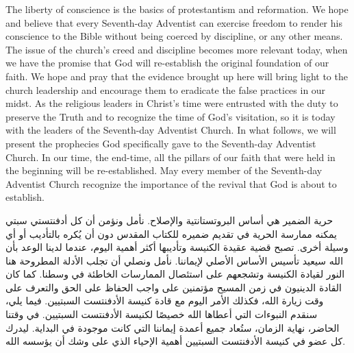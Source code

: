 The liberty of conscience is the basics of protestantism and reformation. We hope and believe that every Seventh-day Adventist can exercise freedom to render his conscience to the Bible without being coerced by discipline, or any other means. The issue of the church's creed and discipline becomes more relevant today, when we have the promise that God will re-establish the original foundation of our faith. We hope and pray that the evidence brought up here will bring light to the church leadership and encourage them to eradicate the false practices in our midst. As the religious leaders in Christ’s time were entrusted with the duty to preserve the Truth and to recognize the time of God’s visitation, so it is today with the leaders of the Seventh-day Adventist Church. In what follows, we will present the prophecies God specifically gave to the Seventh-day Adventist Church. In our time, the end-time, all the pillars of our faith that were held in the beginning will be re-established. May every member of the Seventh-day Adventist Church recognize the importance of the revival that God is about to establish.


حرية الضمير هي أساس البروتستانتية والإصلاح. نأمل ونؤمن أن كل أدفنتستي سبتي يمكنه ممارسة الحرية في تقديم ضميره للكتاب المقدس دون أن يُكره بالتأديب أو أي وسيلة أخرى. تصبح قضية عقيدة الكنيسة وتأديبها أكثر أهمية اليوم، عندما لدينا الوعد بأن الله سيعيد تأسيس الأساس الأصلي لإيماننا. نأمل ونصلي أن تجلب الأدلة المطروحة هنا النور لقيادة الكنيسة وتشجعهم على استئصال الممارسات الخاطئة في وسطنا. كما كان القادة الدينيون في زمن المسيح مؤتمنين على واجب الحفاظ على الحق والتعرف على وقت زيارة الله، فكذلك الأمر اليوم مع قادة كنيسة الأدفنتست السبتيين. فيما يلي، سنقدم النبوءات التي أعطاها الله خصيصًا لكنيسة الأدفنتست السبتيين. في وقتنا الحاضر، نهاية الزمان، ستُعاد جميع أعمدة إيماننا التي كانت موجودة في البداية. ليدرك كل عضو في كنيسة الأدفنتست السبتيين أهمية الإحياء الذي على وشك أن يؤسسه الله.


